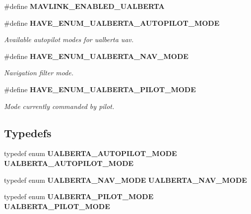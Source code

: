 \begin{DoxyCompactItemize}
\item 
\#define \textbf{ M\+A\+V\+L\+I\+N\+K\+\_\+\+E\+N\+A\+B\+L\+E\+D\+\_\+\+U\+A\+L\+B\+E\+R\+TA}
\item 
\#define \textbf{ H\+A\+V\+E\+\_\+\+E\+N\+U\+M\+\_\+\+U\+A\+L\+B\+E\+R\+T\+A\+\_\+\+A\+U\+T\+O\+P\+I\+L\+O\+T\+\_\+\+M\+O\+DE}
\begin{DoxyCompactList}\small\item\em Available autopilot modes for ualberta uav. \end{DoxyCompactList}\item 
\#define \textbf{ H\+A\+V\+E\+\_\+\+E\+N\+U\+M\+\_\+\+U\+A\+L\+B\+E\+R\+T\+A\+\_\+\+N\+A\+V\+\_\+\+M\+O\+DE}
\begin{DoxyCompactList}\small\item\em Navigation filter mode. \end{DoxyCompactList}\item 
\#define \textbf{ H\+A\+V\+E\+\_\+\+E\+N\+U\+M\+\_\+\+U\+A\+L\+B\+E\+R\+T\+A\+\_\+\+P\+I\+L\+O\+T\+\_\+\+M\+O\+DE}
\begin{DoxyCompactList}\small\item\em Mode currently commanded by pilot. \end{DoxyCompactList}\end{DoxyCompactItemize}
\subsection*{Typedefs}
\begin{DoxyCompactItemize}
\item 
typedef enum \textbf{ U\+A\+L\+B\+E\+R\+T\+A\+\_\+\+A\+U\+T\+O\+P\+I\+L\+O\+T\+\_\+\+M\+O\+DE} \textbf{ U\+A\+L\+B\+E\+R\+T\+A\+\_\+\+A\+U\+T\+O\+P\+I\+L\+O\+T\+\_\+\+M\+O\+DE}
\item 
typedef enum \textbf{ U\+A\+L\+B\+E\+R\+T\+A\+\_\+\+N\+A\+V\+\_\+\+M\+O\+DE} \textbf{ U\+A\+L\+B\+E\+R\+T\+A\+\_\+\+N\+A\+V\+\_\+\+M\+O\+DE}
\item 
typedef enum \textbf{ U\+A\+L\+B\+E\+R\+T\+A\+\_\+\+P\+I\+L\+O\+T\+\_\+\+M\+O\+DE} \textbf{ U\+A\+L\+B\+E\+R\+T\+A\+\_\+\+P\+I\+L\+O\+T\+\_\+\+M\+O\+DE}
\end{DoxyCompactItemize}
